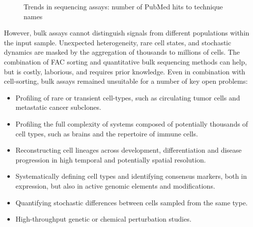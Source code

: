 \begin{figure}[ht]
	\centering
	
	\caption[Trends in sequencing assays]{Trends in sequencing assays: number of PubMed hits to technique names}
	\label{fig:sequencing_assays}
\end{figure}

However, bulk assays cannot distinguish signals from different populations within the input sample. Unexpected heterogeneity, rare cell states, and stochastic dynamics are masked by the aggregation of thousands to millions of cells. The combination of FAC sorting and quantitative bulk sequencing methods can help, but is costly, laborious, and requires prior knowledge. Even in combination with cell-sorting, bulk assays remained unsuitable for a number of key open problems:

\begin{itemize}[noitemsep]
	\item Profiling of rare or transient cell-types, such as circulating tumor cells and metastatic cancer subclones.
	\item Profiling the full complexity of systems composed of potentially thousands of cell types, such as brains and the repertoire of immune cells.
	\item Reconstructing cell lineages across development, differentiation and disease progression in high temporal and potentially spatial resolution.
	\item Systematically defining cell types and identifying consensus markers, both in expression, but also in active genomic elements and modifications.
	\item Quantifying stochastic differences between cells sampled from the same type.
	\item High-throughput genetic or chemical perturbation studies.
\end{itemize}

